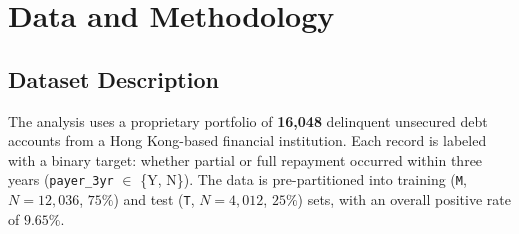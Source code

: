 \documentclass[12pt, a4paper]{article}
\begin{document}
\section{Data and Methodology}\label{sec:methodology}

\subsection{Dataset Description}

The analysis uses a proprietary portfolio of \textbf{16,048} delinquent unsecured debt accounts from a Hong Kong-based financial institution. Each record is labeled with a binary target: whether partial or full repayment occurred within three years (\texttt{payer\_3yr} $\in$ \{Y, N\}). The data is pre-partitioned into training (\texttt{M}, $N = 12{,}036$, $75\%$) and test (\texttt{T}, $N = 4{,}012$, $25\%$) sets, with an overall positive rate of $9.65\%$.
\end{document}

